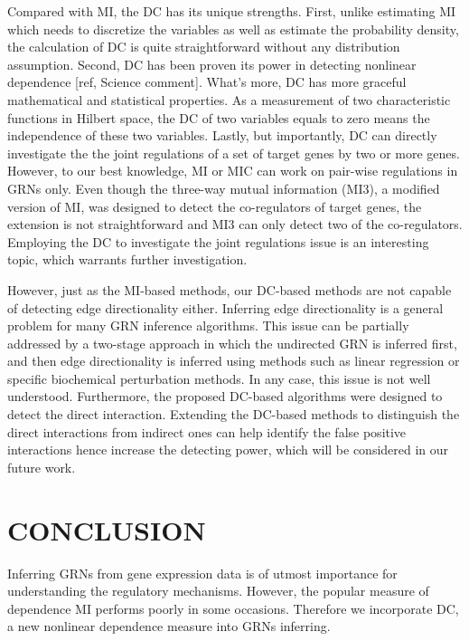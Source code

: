 \documentclass{bioinfo}
\begin{document}
Compared with MI, the DC has its unique strengths. First, unlike
estimating MI which needs to discretize the variables as well as
estimate the probability density, the calculation of DC is quite
straightforward without any distribution assumption. Second, DC has
been proven its power in detecting nonlinear dependence [ref,
Science comment]. What's more, DC has more graceful mathematical and
statistical properties. As a measurement of two characteristic
functions in Hilbert space, the DC of two variables equals to zero
means the independence of these two variables. Lastly, but
importantly, DC can directly investigate the the joint regulations
of a set of target genes by two or more genes. However, to our best
knowledge, MI or MIC can work on pair-wise regulations in GRNs only.
Even though the three-way mutual information
(MI3)\citep{luo2008learning}, a modified version of MI, was designed
to detect the co-regulators of target genes, the extension is not
straightforward and MI3 can only detect two of the
co-regulators\citep{zhang2012inferring}. Employing the DC to
investigate the joint regulations issue is an interesting topic,
which warrants further investigation.

However, just as the MI-based methods, our DC-based methods are not
capable of detecting edge directionality either. Inferring edge
directionality is a general problem for many GRN inference
algorithms. This issue can be partially addressed by a two-stage
approach in which the undirected GRN is inferred first, and then
edge directionality is inferred using methods such as linear
regression or specific biochemical perturbation
methods\citep{carrera2009model,margolin2006reverse}. In any case,
this issue is not well understood. Furthermore, the proposed
DC-based algorithms were designed to detect the direct interaction.
Extending the DC-based methods to distinguish the direct
interactions from indirect ones can help identify the false positive
interactions hence increase the detecting power, which will be
considered in our future work.


\section{CONCLUSION}
Inferring GRNs from gene expression data is of utmost importance for
understanding the regulatory mechanisms. However, the popular
measure of dependence MI performs poorly in some occasions.
Therefore we incorporate DC, a new nonlinear dependence measure into
GRNs inferring.
\end{document}
